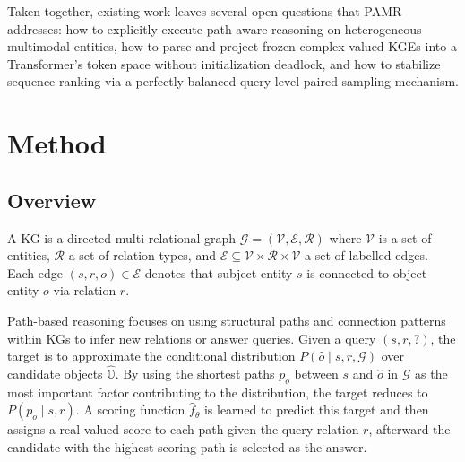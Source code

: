 \documentclass[runningheads]{llncs}
\begin{document}

Taken together, existing work leaves several open questions that PAMR addresses: how to explicitly execute path-aware reasoning on heterogeneous multimodal entities, how to parse and project frozen complex-valued KGEs into a Transformer's token space without initialization deadlock, and how to stabilize sequence ranking via a perfectly balanced query-level paired sampling mechanism.

\section{Method}
\label{sec:method}
\subsection{Overview}
\label{sec:overview}

A KG is a directed multi-relational graph
$\mathcal{G} = (\mathcal{V}, \mathcal{E}, \mathcal{R})$ where
$\mathcal{V}$ is a set of entities, $\mathcal{R}$ a set of relation types,
and $\mathcal{E} \subseteq \mathcal{V} \times \mathcal{R} \times \mathcal{V}$
a set of labelled edges. Each edge $(s, r, o) \in \mathcal{E}$
denotes that subject entity $s$ is connected to object entity $o$
via relation $r$.

Path-based reasoning focuses on using structural paths and connection
patterns within KGs to infer new relations or answer queries. Given
a query $(s, r, ?)$, the target is to approximate the conditional
distribution $P(\hat{o} \mid s, r, \mathcal{G})$ over candidate
objects $\hat{\mathbb{O}}$. By using the shortest paths $p_o$ between $s$ and $\hat{o}$ in $\mathcal{G}$ as the most important factor contributing to the distribution,
the target reduces to $P(p_o \mid s, r)$. A scoring function
$\hat{f}_\theta$ is learned to predict this target and then assigns a real-valued score to each path given the
query relation $r$, afterward the candidate with the highest-scoring path is selected as the answer.
\end{document}
